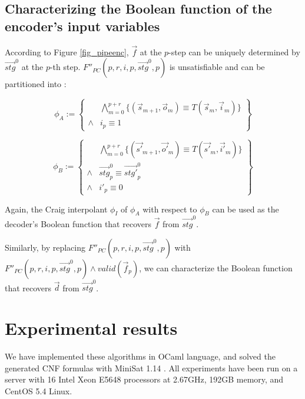 \documentclass[runningheads,a4paper,orivec]{llncs}
\begin{document}
\subsection{Characterizing the Boolean function of the encoder's input variables}

According to Figure \ref{fig_pipeenc},
$\vec{f}$ at the $p$-step can be uniquely determined by $\vec{stg}^0$ at the $p$-th step.
$F''_{PC}(p,r,i,p,\vec{stg}^0,p)$ is unsatisfiable and can be partitioned into :

\begin{equation}
\phi_A:=
\left\{
\begin{array}{cc}
&\bigwedge_{m=0}^{p+r}
\{
(\vec{s}_{m+1},\vec{o}_m)\equiv T(\vec{s}_m,\vec{i}_m)
\}
\\
\wedge& i_{p}\equiv 1 
\end{array}
\right\}
\end{equation}

\begin{equation}
\phi_B:=
\left\{
\begin{array}{cc}
&\bigwedge_{m=0}^{p+r}
\{
(\vec{s'}_{m+1},\vec{o'}_m)\equiv T(\vec{s'}_m,\vec{i'}_m)
\}
\\
\wedge&\vec{stg}^0_p\equiv \vec{stg'}^0_p \\
\wedge& i'_{p}\equiv 0 
\end{array}
\right\}
\end{equation}

Again,
the Craig interpolant $\phi_I$ of $\phi_A$ with respect to $\phi_B$ 
can be used as the decoder's Boolean function that recovers $\vec{f}$ from $\vec{stg}^0$.

Similarly,
by replacing $F''_{PC}(p,r,i,p,\vec{stg}^0,p)$ with $F''_{PC}(p,r,i,p,\vec{stg}^0,p)\wedge valid(\vec{f}_p)$,
we can characterize the Boolean function that recovers $\vec{d}$ from $\vec{stg}^0$.



\section{Experimental results}\label{sec_exp}
We have implemented these algorithms in OCaml language,
and solved the generated CNF formulas with MiniSat 1.14 \cite{EXTSAT}.
All experiments have been run on a server with 16 Intel Xeon E5648 processors at 2.67GHz, 
192GB memory, and CentOS 5.4 Linux.
\end{document}
